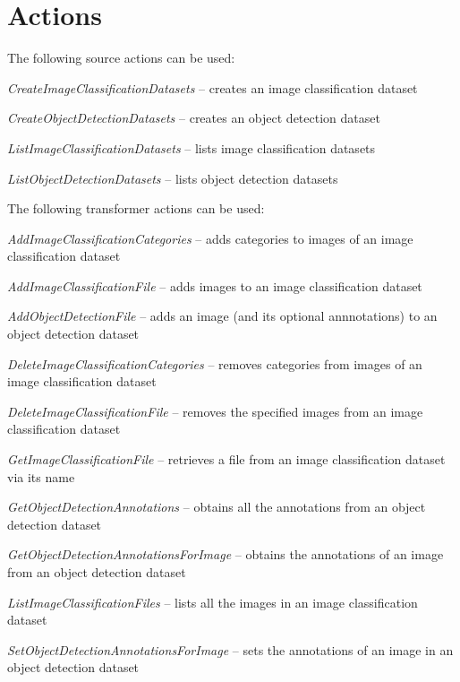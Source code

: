 \documentclass[a4paper]{book}
\begin{document}
\section{Actions}
The following source actions can be used:
\begin{tight_itemize}
  \item \textit{CreateImageClassificationDatasets} -- creates an image classification dataset
  \item \textit{CreateObjectDetectionDatasets} -- creates an object detection dataset
  \item \textit{ListImageClassificationDatasets} -- lists image classification datasets
  \item \textit{ListObjectDetectionDatasets} -- lists object detection datasets
\end{tight_itemize}
The following transformer actions can be used:
\begin{tight_itemize}
  \item \textit{AddImageClassificationCategories} -- adds categories to images of an image classification dataset
  \item \textit{AddImageClassificationFile} -- adds images to an image classification dataset
  \item \textit{AddObjectDetectionFile} -- adds an image (and its optional annnotations) to an object detection dataset
  \item \textit{DeleteImageClassificationCategories} -- removes categories from images of an image classification dataset
  \item \textit{DeleteImageClassificationFile} -- removes the specified images from an image classification dataset
  \item \textit{GetImageClassificationFile} -- retrieves a file from an image classification dataset via its name
  \item \textit{GetObjectDetectionAnnotations} -- obtains all the annotations from an object detection dataset
  \item \textit{GetObjectDetectionAnnotationsForImage} -- obtains the annotations of an image from an object detection dataset
  \item \textit{ListImageClassificationFiles} -- lists all the images in an image classification dataset
  \item \textit{SetObjectDetectionAnnotationsForImage} -- sets the annotations of an image in an object detection dataset
\end{tight_itemize}


\end{document}
